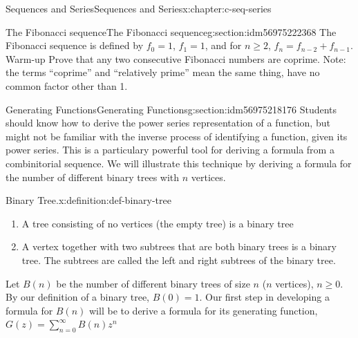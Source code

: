 \documentclass[twoside,10pt,]{book}
\numberwithin{equation}{section}
\begin{document}
%
%
\typeout{************************************************}
\typeout{************************************************}
%
\begin{chapterptx}{Sequences and Series}{}{Sequences and Series}{}{}{x:chapter:c-seq-series}
\begin{introduction}{}%
%
\end{introduction}%
%
%
\typeout{************************************************}
\typeout{************************************************}
%
\begin{sectionptx}{The Fibonacci sequence}{}{The Fibonacci sequence}{}{}{g:section:idm56975222368}
%
The Fibonacci sequence is defined by  \(f_0=1\), \(f_1= 1\), and for \(n\geq 2\), \(f_n= f_{n-2}+f_{n-1}\). Warm-up  Prove that any two consecutive Fibonacci numbers are coprime.  Note:  the terms  ``coprime''  and   ``relatively prime'' mean the same thing, have no common factor other than 1.%
\end{sectionptx}
%
%
\typeout{************************************************}
\typeout{************************************************}
%
\begin{sectionptx}{Generating Functions}{}{Generating Functions}{}{}{g:section:idm56975218176}
%
Students should know how to derive the power series representation of a function, but might not be familiar with the inverse process of identifying  a function, given its power series.   This is a particulary powerful tool for deriving a formula from a combinitorial sequence. We will illustrate this technique by deriving a formula for the number of different binary trees with \(n\) vertices.%
\begin{definition}{Binary Tree.}{x:definition:def-binary-tree}%
%
%
\begin{enumerate}[label=(\arabic*)]
\item{}A tree consisting of no vertices (the empty tree) is a binary tree%
\item{}A vertex together with two subtrees that are both binary trees is a binary tree. The subtrees are called the left and right subtrees of the binary tree.%
\end{enumerate}
%
\end{definition}
Let \(B(n)\) be the number of different binary trees of size \(n\) (\(n\) vertices), \(n \geq  0\). By our definition of a binary tree, \(B(0) = 1\). Our first step in developing a formula for \(B(n)\) will be to derive a formula for its generating function, \(G(z)=\sum_{n=0}^{\infty} B(n)z^n\)%

\end{sectionptx}
\end{chapterptx}
\end{document}
